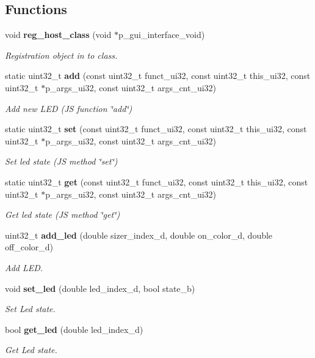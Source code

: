 \subsection*{Functions}
\begin{DoxyCompactItemize}
\item 
void \textbf{ reg\+\_\+host\+\_\+class} (void $\ast$p\+\_\+gui\+\_\+interface\+\_\+void)
\begin{DoxyCompactList}\small\item\em Registration object in to class. \end{DoxyCompactList}\item 
static uint32\+\_\+t \textbf{ add} (const uint32\+\_\+t funct\+\_\+ui32, const uint32\+\_\+t this\+\_\+ui32, const uint32\+\_\+t $\ast$p\+\_\+args\+\_\+ui32, const uint32\+\_\+t args\+\_\+cnt\+\_\+ui32)
\begin{DoxyCompactList}\small\item\em Add new L\+ED (JS function \char`\"{}add\char`\"{}) \end{DoxyCompactList}\item 
static uint32\+\_\+t \textbf{ set} (const uint32\+\_\+t funct\+\_\+ui32, const uint32\+\_\+t this\+\_\+ui32, const uint32\+\_\+t $\ast$p\+\_\+args\+\_\+ui32, const uint32\+\_\+t args\+\_\+cnt\+\_\+ui32)
\begin{DoxyCompactList}\small\item\em Set led state (JS method \char`\"{}set\char`\"{}) \end{DoxyCompactList}\item 
static uint32\+\_\+t \textbf{ get} (const uint32\+\_\+t funct\+\_\+ui32, const uint32\+\_\+t this\+\_\+ui32, const uint32\+\_\+t $\ast$p\+\_\+args\+\_\+ui32, const uint32\+\_\+t args\+\_\+cnt\+\_\+ui32)
\begin{DoxyCompactList}\small\item\em Get led state (JS method \char`\"{}get\char`\"{}) \end{DoxyCompactList}\item 
uint32\+\_\+t \textbf{ add\+\_\+led} (double sizer\+\_\+index\+\_\+d, double on\+\_\+color\+\_\+d, double off\+\_\+color\+\_\+d)
\begin{DoxyCompactList}\small\item\em Add L\+ED. \end{DoxyCompactList}\item 
void \textbf{ set\+\_\+led} (double led\+\_\+index\+\_\+d, bool state\+\_\+b)
\begin{DoxyCompactList}\small\item\em Set Led state. \end{DoxyCompactList}\item 
bool \textbf{ get\+\_\+led} (double led\+\_\+index\+\_\+d)
\begin{DoxyCompactList}\small\item\em Get Led state. \end{DoxyCompactList}\end{DoxyCompactItemize}


